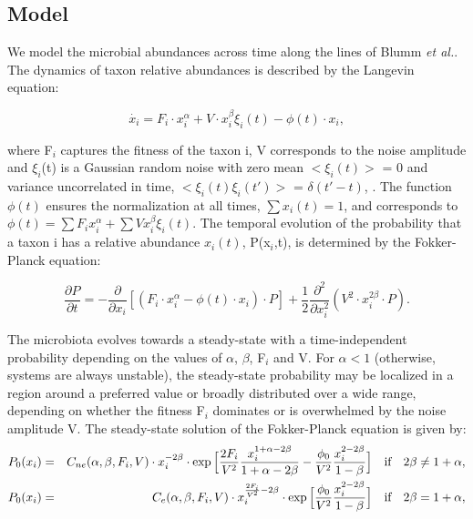 \subsection*{Model} \label{sec:model}

We model the microbial abundances across time along the lines of Blumm \textit{et al.}\cite{ranking}. The dynamics of taxon relative abundances is described by the Langevin equation:
\begin{linenomath}
\begin{equation}
\dot{x_i} = F_i \cdot x_i^\alpha + V \cdot x_i^\beta \xi_i(t) - \phi(t) \cdot x_i,
\end{equation}
\end{linenomath}
where F$_i$ captures the fitness of the taxon i, V corresponds to the noise amplitude and $\xi_i$(t) is a Gaussian random noise with zero mean  $<\xi_i(t)>$ = 0 and variance uncorrelated in time, $<\xi_i(t) \xi_i(t')>$ =  $\delta(t'-t)$, . The function $\phi(t)$ ensures the normalization at all times, $\sum x_i(t) = 1$, and corresponds to $\phi(t) = \sum F_i x_i^\alpha + \sum V x_i^\beta \xi_i(t)$.
The temporal evolution of the probability that a taxon i has a relative abundance $x_i(t)$, P(x$_i$,t), is determined by the Fokker-Planck equation:
\begin{linenomath}
\begin{equation}
\frac{\partial P}{\partial t} = - \frac{\partial}{\partial x_i}  [(F_i \cdot x_i^\alpha - \phi(t) \cdot x_i ) \cdot P]+ \frac{1}{2} \frac{\partial^2}{\partial x_i^2} (V^2 \cdot x_i^{2\beta}\cdot P).
\end{equation}
\end{linenomath}
The microbiota evolves towards a steady-state with a time-independent probability depending on the values of $\alpha$, $\beta$, F$_i$ and V. For $\alpha<1$ (otherwise, systems are always unstable), the steady-state probability may be localized in a region around a preferred value or broadly distributed over a wide range, depending on whether the fitness F$_i$  dominates or is overwhelmed by the noise amplitude V. The steady-state solution of the Fokker-Planck equation is given by:
\begin{eqnarray}
P_0 (x_i) &=& C_{ne}(\alpha,\beta,F_i,V)  \cdot x_i^{-2\beta}  \cdot \exp\Big[\frac{2F_i}{V^2}\frac{x_i^{1+\alpha-2\beta}}{1+\alpha-2\beta}-\frac{\phi_0}{V^2}\frac{x_i^{2-2\beta}}{1-\beta}\Big] \quad \textrm{if} \quad  2\beta \ne 1+\alpha, \notag \\
P_0 (x_i) &=& C_e(\alpha,\beta,F_i,V)  \cdot x_i^{\frac{2F_i}{V^2} -2\beta}  \cdot \exp\Big[\frac{\phi_0}{V^2}\frac{x_i^{2-2\beta}}{1-\beta}\Big] \quad \textrm{if} \quad  2\beta = 1+\alpha,
\notag
\end{eqnarray}
